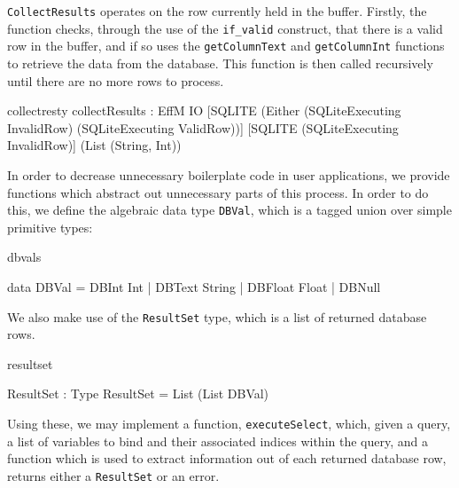 \texttt{CollectResults} operates on the row currently held in the buffer. Firstly, the function checks, through the use of the \texttt{if\_valid} construct, that there is a valid row in the buffer, and if so uses the \texttt{getColumnText} and \texttt{getColumnInt} functions
to retrieve the data from the database. This function is then
called recursively until there are no more rows to process.

\begin{SaveVerbatim}{collectresty}
collectResults :
  EffM IO [SQLITE (Either (SQLiteExecuting InvalidRow) 
                          (SQLiteExecuting ValidRow))] 
          [SQLITE (SQLiteExecuting InvalidRow)] 
          (List (String, Int))
\end{SaveVerbatim}


\noindent
{}

\noindent
{}

In order to decrease unnecessary boilerplate code in user applications, we
provide functions which abstract out unnecessary parts of this process. In
order to do this, we define the algebraic data type \texttt{DBVal}, which is a
tagged union over simple primitive types:

\begin{SaveVerbatim}{dbvals}

data DBVal = DBInt Int     | DBText String
           | DBFloat Float | DBNull

\end{SaveVerbatim}

\noindent
We also make use of the \texttt{ResultSet} type, which is a list of returned
database rows.

\begin{SaveVerbatim}{resultset}

ResultSet : Type
ResultSet = List (List DBVal)

\end{SaveVerbatim}

\noindent
Using these, we may implement a function, \texttt{executeSelect}, which, given
a query, a list of variables to bind and their associated indices within the
query, and a function which is used to extract information out of each returned
database row, returns either a \texttt{ResultSet} or an error.

